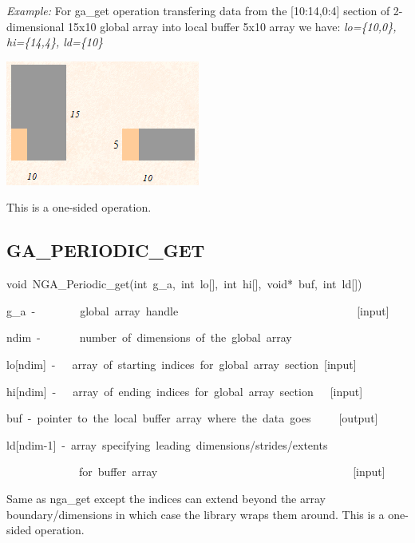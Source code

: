 \emph{Example:} For ga\_get operation transfering data from the {[}10:14,0:4{]}
section of 2-dimensional 15x10 global array into local buffer 5x10
array we have: \emph{lo=\{10,0\}, hi=\{14,4\}, ld=\{10\} }

\includegraphics{GA_Get}

This is a one-sided operation.


\subsection*{\label{sub:GA_PERIODIC_GET}GA\_PERIODIC\_GET}
\begin{lyxcode}
void~NGA\_Periodic\_get(int~g\_a,~int~lo{[}{]},~int~hi{[}{]},~void{*}~buf,~int~ld{[}{]})



g\_a~-~~~~~~~~global~array~handle~~~~~~~~~~~~~~~~~~~~~~~~~~~~~~~~{[}input{]}~

ndim~-~~~~~~~number~of~dimensions~of~the~global~array~

lo{[}ndim{]}~-~~~array~of~starting~indices~for~global~array~section~{[}input{]}

hi{[}ndim{]}~-~~~array~of~ending~indices~for~global~array~section~~~{[}input{]}

buf~-~pointer~to~the~local~buffer~array~where~the~data~goes~~~~~{[}output{]}

ld{[}ndim-1{]}~-~array~specifying~leading~dimensions/strides/extents~

~~~~~~~~~~~~~for~buffer~array~~~~~~~~~~~~~~~~~~~~~~~~~~~~~~~~~~~{[}input{]}
\end{lyxcode}
Same as nga\_get except the indices can extend beyond the array boundary/dimensions
in which case the library wraps them around. This is a one-sided operation. 


